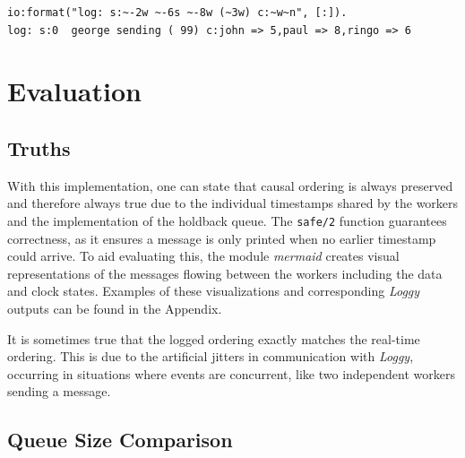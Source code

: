 \documentclass[a4paper, 11pt]{article}
\begin{document}
\begin{verbatim}
io:format("log: s:~-2w ~-6s ~-8w (~3w) c:~w~n", [:]).
log: s:0  george sending ( 99) c:john => 5,paul => 8,ringo => 6
\end{verbatim}

\section{Evaluation}


\subsection{Truths}

With this implementation, one can state that causal ordering is always preserved and therefore always true due to the individual timestamps shared by the workers and the implementation of the holdback queue.
The \texttt{safe/2} function guarantees correctness, as it ensures a message is only printed when no earlier timestamp could arrive. 
To aid evaluating this, the module \textit{mermaid} creates visual representations of the messages flowing between the workers including the data and clock states. Examples of these visualizations and corresponding \textit{Loggy} outputs can be found in the Appendix.

It is sometimes true that the logged ordering exactly matches the real-time ordering. This is due to the artificial jitters in communication with \textit{Loggy}, occurring in situations where events are concurrent, like two independent workers sending a message.

\subsection{Queue Size Comparison}
\end{document}
